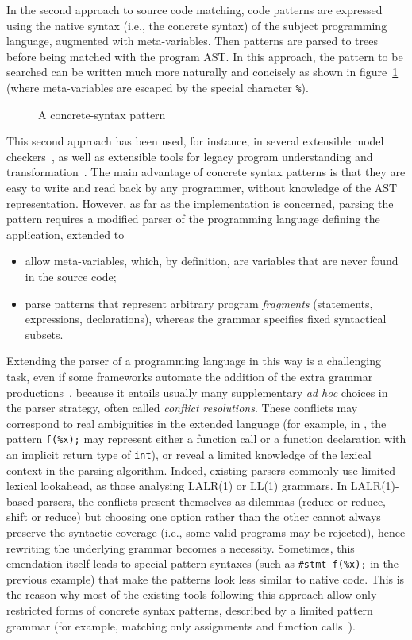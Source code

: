 In the second approach to source code matching, code patterns are
expressed using the native syntax (i.e., the concrete syntax) of the
subject programming language, augmented with meta\hyp{}variables. Then
patterns are parsed to trees before being matched with the program
AST. In this approach, the pattern to be searched can be written much
more naturally and concisely as shown in
figure~\ref{intro:concrete_pattern} (where meta\hyp{}variables are
escaped by the special character \texttt{\%}).
\begin{figure}[H]
%
\caption{A concrete\hyp{}syntax pattern\label{intro:concrete_pattern}}
\end{figure}
\noindent This second approach has been used, for instance, in several
extensible model checkers~\cite{cecil, mc, mj, blast}, as well as
extensible tools for legacy program understanding and
transformation~\cite{native, behavioral}. The main advantage of
concrete syntax patterns is that they are easy to write and read back
by any programmer, without knowledge of the AST
representation. However, as far as the implementation is concerned,
parsing the pattern requires a modified parser of the programming
language defining the application, extended to
\begin{itemize}

  \item allow meta\hyp{}variables, which, by definition, are variables
    that are never found in the source code;

  \item parse patterns that represent arbitrary program
    \emph{fragments} (statements, expressions, declarations), whereas
    the grammar specifies fixed syntactical subsets.
\end{itemize}
Extending the parser of a programming language in this way is a
challenging task, even if some frameworks automate the addition of the
extra grammar productions~\cite{refine}, because it entails usually
many supplementary \emph{ad hoc} choices in the parser strategy, often
called \emph{conflict resolutions}. These conflicts may correspond to
real ambiguities in the extended language (for example, in \Clang, the
pattern \texttt{f(\%x);} may represent either a function call or a
function declaration with an implicit return type of \texttt{int}), or
reveal a limited knowledge of the lexical context in the parsing
algorithm. Indeed, existing parsers commonly use limited lexical
lookahead, as those analysing LALR(1) or LL(1) grammars. In
LALR(1)\hyp{}based parsers, the conflicts present themselves as
dilemmas (reduce or reduce, shift or reduce) but choosing one option
rather than the other cannot always preserve the syntactic coverage
(i.e., some valid programs may be rejected), hence rewriting the
underlying grammar becomes a necessity. Sometimes, this emendation
itself leads to special pattern syntaxes (such as \texttt{\#stmt
f(\%x);} in the previous example) that make the patterns look less
similar to native code. This is the reason why most of the existing
tools following this approach allow only restricted forms of concrete
syntax patterns, described by a limited pattern grammar (for example,
matching only assignments and function calls~\cite{blast-ql}).

